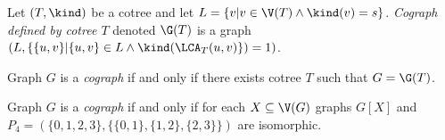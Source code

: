\begin{defi}\label{codef3}
    Let $(T, \kind)$ be a cotree and let $L = \{v | v \in \V(T) \land \kind(v) = s\}$. \emph{Cograph defined by cotree $T$} denoted $\G(T)$ is a graph $(L, \{\{u,v\} | \{u,v\} \in L \land \kind(\LCA_T(u,v)\}) = 1)$.

    Graph $G$ is a \emph{cograph} if and only if there exists cotree $T$ such that $G = \G(T)$.
\end{defi}

\begin{defi}\label{codef4}
    Graph $G$ is a \emph{cograph} if and only if for each $X \subseteq \V(G)$ graphs $G[X]$ and $P_4 = (\{0,1,2,3\}, \{\{0,1\},\{1,2\},\{2,3\}\})$ are  isomorphic.
\end{defi}
